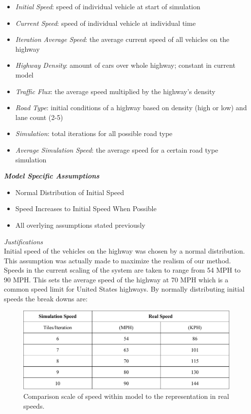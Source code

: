 \documentclass{amsart}
\begin{document}
\begin{itemize}
	\item \textit{Initial Speed}: speed of individual vehicle at start of simulation
	\item \textit{Current Speed}: speed of individual vehicle at individual time	
	\item \textit{Iteration Average Speed}: the average current speed of all vehicles on the highway
	\item \textit{Highway Density}: amount of cars over whole highway; constant in current model
	\item \textit{Traffic Flux}: the average speed multiplied by the highway's density
	\item \textit{Road Type}: initial conditions of a highway based on density (high or low) and lane count (2-5)
	\item \textit{Simulation}: total iterations for all possible road type	
	\item \textit{Average Simulation Speed}: the average speed for a certain road type simulation
\end{itemize}
	
\textit{\textbf{Model Specific Assumptions}}

	\begin{itemize}
	\item Normal Distribution of Initial Speed
	\item Speed Increases to Initial Speed When Possible
	\item All overlying assumptions stated previously
\end{itemize}

\textit{Justifications}\\


	
	
	
	Initial speed of the vehicles on the highway was chosen by a normal distribution.  This assumption was actually made to maximize the realism of our method.  Speeds in the current scaling of the system are taken to range from 54 MPH to 90 MPH.  This sets the average speed of the highway at 70 MPH which is a common speed limit for United States highways.  By normally distributing initial speeds the break downs are:
	
	\begin{figure}[h]
\begin{center}
\includegraphics[scale=0.5]{MCM-SimulationSpeedTable.pdf}
\caption{Comparison scale of speed within model to the representation in real speeds.}
\renewcommand{\figurename}{Speed Scaling}
\end{center}
\end{figure}
\end{document}

